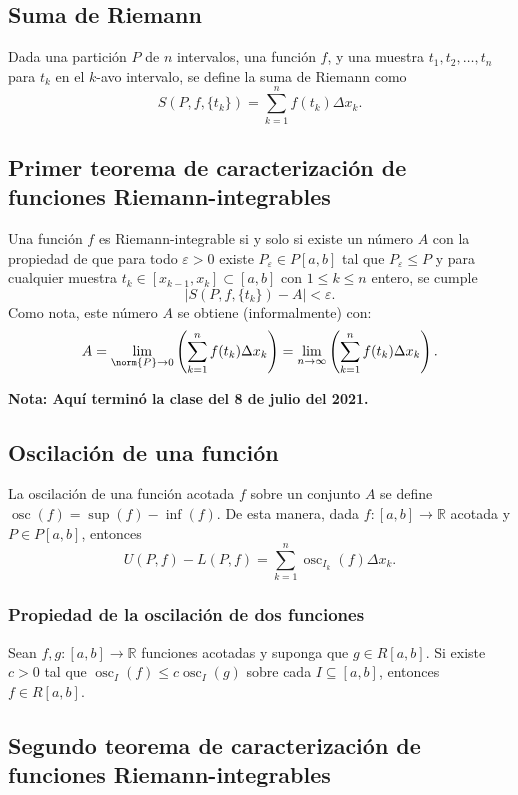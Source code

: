 \documentclass{article}
\DeclareMathOperator{\osc}{osc}
\begin{document}
\subsection*{Suma de Riemann}

Dada una partición $P$ de $n$ intervalos, una función $f$, y una muestra $t_1,t_2,\ldots,t_n$ para $t_k$ en el $k$-avo intervalo, se define la suma de Riemann como
$$S(P,f,\{t_k\})=\sum_{k=1}^n f(t_k)\Delta x_k.$$

\subsection*{Primer teorema de caracterización de funciones Riemann-integrables}

Una función $f$ es Riemann-integrable si y solo si existe un número $A$ con la propiedad de que para todo $\varepsilon>0$ existe $P_{\varepsilon}\in P[a,b]$ tal que $P_{\varepsilon}\leq P$ y para cualquier muestra $t_k\in[x_{k-1},x_k]\subset[a,b]$ con $1\leq k\leq n$ entero, se cumple
$$|S(P,f,\{t_k\})-A|<\varepsilon.$$
Como nota, este número $A$ se obtiene (informalmente) con:
$$A=\lim_{\norm{P}\to 0}\left(\sum_{k=1}^{n} f(t_k)\Delta x_k\right)=\lim_{n\to\infty}\left(\sum_{k=1}^{n} f(t_k)\Delta x_k\right).$$

\vspace{10pt}
\textbf{Nota: Aquí terminó la clase del 8 de julio del 2021.}
\newpage

\subsection*{Oscilación de una función}

La oscilación de una función acotada $f$ sobre un conjunto $A$ se define $\osc(f)=\sup(f)-\inf(f)$. De esta manera, dada $f:[a,b]\to\mathbb{R}$ acotada y $P\in P[a,b]$, entonces
$$U(P,f)-L(P,f)=\sum_{k=1}^{n}\osc_{I_k}(f)\Delta x_k.$$

\subsubsection*{Propiedad de la oscilación de dos funciones}

Sean $f,g:[a,b]\to\mathbb{R}$ funciones acotadas y suponga que $g\in R[a,b]$. Si existe $c>0$ tal que $\osc_I(f)\leq c\osc_I(g)$ sobre cada $I\subseteq[a,b]$, entonces $f\in R[a,b]$.

\subsection*{Segundo teorema de caracterización de funciones Riemann-integrables}
\end{document}
